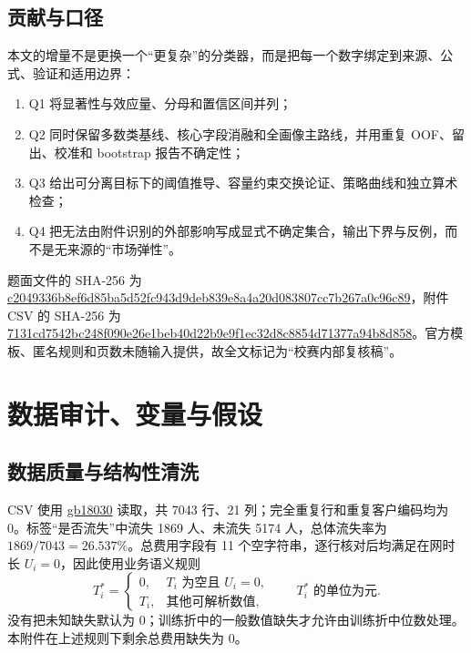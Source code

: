 \documentclass[UTF8,a4paper,11pt]{ctexart}
\newcommand{\code}[1]{\url{#1}}
\begin{document}
\subsection{贡献与口径}
本文的增量不是更换一个“更复杂”的分类器，而是把每一个数字绑定到来源、公式、验证和适用边界：
\begin{enumerate}[label=\textbf{C\arabic*}.,leftmargin=2.5em]
  \item Q1 将显著性与效应量、分母和置信区间并列；
  \item Q2 同时保留多数类基线、核心字段消融和全画像主路线，并用重复 OOF、留出、校准和 bootstrap 报告不确定性；
  \item Q3 给出可分离目标下的阈值推导、容量约束交换论证、策略曲线和独立算术检查；
  \item Q4 把无法由附件识别的外部影响写成显式不确定集合，输出下界与反例，而不是无来源的“市场弹性”。
\end{enumerate}

题面文件的 SHA-256 为
\code{c2049336b8ef6d85ba5d52fc943d9deb839e8a4a20d083807cc7b267a0c96c89}，附件 CSV 的 SHA-256 为
\code{7131cd7542bc248f090e26e1beb40d22b9e9f1ec32d8c8854d71377a94b8d858}。官方模板、匿名规则和页数未随输入提供，故全文标记为“校赛内部复核稿”。

\section{数据审计、变量与假设}
\label{sec:data-v2}

\subsection{数据质量与结构性清洗}
CSV 使用 \code{gb18030} 读取，共 7043 行、21 列；完全重复行和重复客户编码均为 0。标签“是否流失”中流失 1869 人、未流失 5174 人，总体流失率为
\(1869/7043=26.537\%\)。总费用字段有 11 个空字符串，逐行核对后均满足在网时长 \(U_i=0\)，因此使用业务语义规则
\begin{equation}
T_i^*=\begin{cases}
0,&T_i\text{ 为空且 }U_i=0,\\
T_i,&\text{其他可解析数值},
\end{cases}
\qquad T_i^*\text{ 的单位为元}.
\label{eq:clean-v2}
\end{equation}
没有把未知缺失默认为 0；训练折中的一般数值缺失才允许由训练折中位数处理。本附件在上述规则下剩余总费用缺失为 0。
\end{document}

